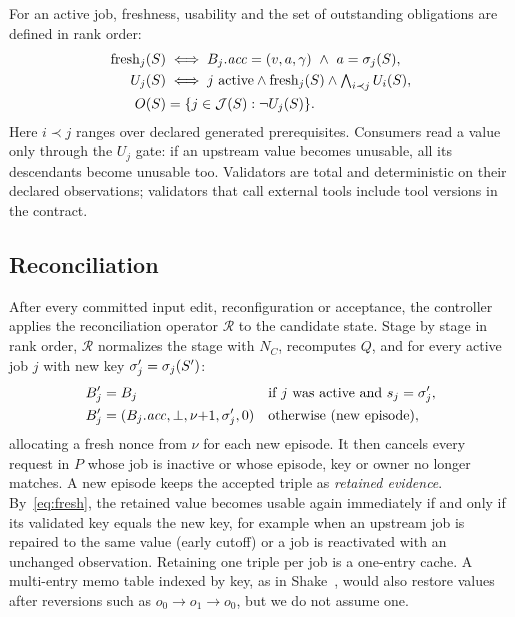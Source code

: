 For an active job, freshness, usability and the set of outstanding obligations are defined in rank order:
\begin{align}
\fresh_j(S)&\iff B_j.\mathit{acc}=(v,a,\gamma)\ \land\ a=\Sig_j(S),\label{eq:fresh}\\
U_j(S)&\iff j\text{ active}\land\fresh_j(S)\land\textstyle\bigwedge_{i\prec j}U_i(S),\label{eq:usable}\\
O(S)&=\{j\in\Jobs(S):\neg U_j(S)\}.\label{eq:obligation}
\end{align}
Here $i\prec j$ ranges over declared generated prerequisites. Consumers read a value only through the $U_j$ gate: if an upstream value becomes unusable, all its descendants become unusable too. Validators are total and deterministic on their declared observations; validators that call external tools include tool versions in the contract.

\subsection{Reconciliation}\label{sec:recon}
After every committed input edit, reconfiguration or acceptance, the controller applies the reconciliation operator $\mathcal R$ to the candidate state. Stage by stage in rank order, $\mathcal R$ normalizes the stage with $N_C$, recomputes $Q$, and for every active job $j$ with new key $\sigma'_j=\sigma_j(S')$:
\begin{equation}\label{eq:recon}
\begin{aligned}
B'_j&=B_j &&\text{if } j \text{ was active and } s_j=\sigma'_j,\\
B'_j&=(B_j.\mathit{acc},\bot,\nu{+}1,\sigma'_j,0) &&\text{otherwise (new episode)},
\end{aligned}
\end{equation}
allocating a fresh nonce from $\nu$ for each new episode. It then cancels every request in $P$ whose job is inactive or whose episode, key or owner no longer matches. A new episode keeps the accepted triple as \emph{retained evidence}. By~\eqref{eq:fresh}, the retained value becomes usable again immediately if and only if its validated key equals the new key, for example when an upstream job is repaired to the same value (early cutoff) or a job is reactivated with an unchanged observation. Retaining one triple per job is a one-entry cache. A multi-entry memo table indexed by key, as in Shake~\cite{mitchell2012shake}, would also restore values after reversions such as $o_0\to o_1\to o_0$, but we do not assume one.

